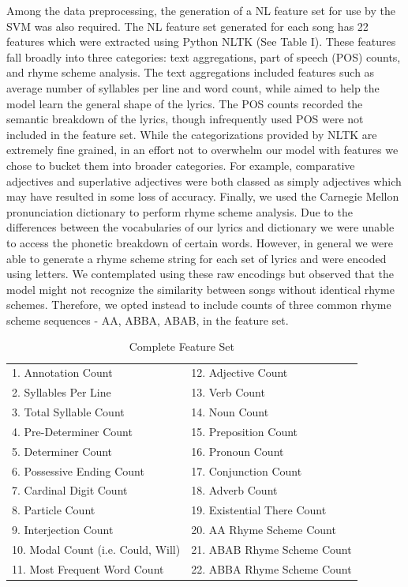 \documentclass[journal]{IEEEtran}
\begin{document}
Among the data preprocessing, the generation of a NL feature set for use by the SVM was also required. The NL feature set generated for each song has 22 features which were extracted using Python NLTK (See Table I). These features fall broadly into three categories: text aggregations, part of speech (POS) counts, and rhyme scheme analysis. The text aggregations included features such as average number of syllables per line and word count, while aimed to help the model learn the general shape of the lyrics. The POS counts recorded the semantic breakdown of the lyrics, though infrequently used POS were not included in the feature set. While the categorizations provided by NLTK are extremely fine grained, in an effort not to overwhelm our model with features we chose to bucket them into broader categories. For example, comparative adjectives and superlative adjectives were both classed as simply adjectives which may have resulted in some loss of accuracy. Finally, we used the Carnegie Mellon pronunciation dictionary to perform rhyme scheme analysis. Due to the differences between the vocabularies of our lyrics and dictionary we were unable to access the phonetic breakdown of certain words. However, in general we were able to generate a rhyme scheme string for each set of lyrics and were encoded using letters. We contemplated using these raw encodings but observed that the model might not recognize the similarity between songs without identical rhyme schemes. Therefore, we opted instead to include counts of three common rhyme scheme sequences - AA, ABBA, ABAB, in the feature set.

\begin{table}[h!]
    \label{tab:table1}
    \centering
    \caption{Complete Feature Set}
    \begin{tabular}{ll}
       & \\
      \hline
      
	1. Annotation Count & 12. Adjective Count \\
	2. Syllables Per Line & 13. Verb Count \\
	3. Total Syllable Count & 14. Noun Count \\
	4. Pre-Determiner Count& 15. Preposition Count \\
	5. Determiner Count & 16. Pronoun Count \\
	6. Possessive Ending Count & 17. Conjunction Count\\
	7. Cardinal Digit Count & 18. Adverb Count\\
	8. Particle Count & 19. Existential There Count \\
	9. Interjection Count & 20. AA Rhyme Scheme Count \\
	10. Modal Count (i.e. Could, Will)  & 21. ABAB Rhyme Scheme Count \\
	11. Most Frequent Word Count & 22. ABBA Rhyme Scheme Count
	
    \end{tabular}
\end{table}
\end{document}
